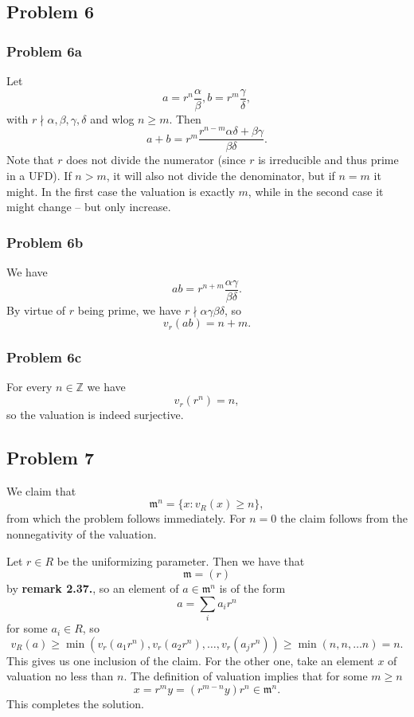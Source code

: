 \subsection*{Problem 6}

\subsubsection*{Problem 6a}

Let
\[ 
    a = r^n \frac{\alpha}{\beta}, b = r^m \frac{\gamma}{\delta},
\]
with \( r \nmid \alpha, \beta, \gamma, \delta \) and wlog \( n \geqslant m \). Then
\[ 
    a + b = r^m \frac{r^{n-m}\alpha\delta + \beta\gamma}{\beta\delta}.
\]
Note that \( r \) does not divide the numerator (since \( r \) is irreducible
and thus prime in a UFD). If \( n > m \), it will also not divide the denominator,
but if \( n = m \) it might. In the first case the valuation is exactly \( m \),
while in the second case it might change -- but only increase.

\subsubsection*{Problem 6b}

We have
\[ 
    ab = r^{n+m} \frac{\alpha\gamma}{\beta\delta}. 
\]
By virtue of \( r\) being prime, we have \( r \nmid \alpha\gamma\beta\delta \),
so
\[ 
    v_r(ab) = n + m. 
\]

\subsubsection*{Problem 6c}

For every \( n \in \mathbb{Z} \) we have
\[ 
    v_r(r^n) = n,   
\]
so the valuation is indeed surjective.

\subsection*{Problem 7}

We claim that
\[ 
    \mathfrak{m}^n = \{ x : v_R(x) \geqslant n \}, 
\]
from which the problem follows immediately. For \( n = 0 \) the claim follows
from the nonnegativity of the valuation.

Let \( r \in R \) be the uniformizing parameter. Then we have that 
\[ 
    \mathfrak{m} = (r)
\]
by {\bf remark 2.37.}, so an element of \(a \in \mathfrak{m}^n \) is of the form
\[ 
    a = \sum_i a_i r^n
\]
for some \( a_i \in R \), so 
\[ 
    v_R(a) \geqslant \min (v_r(a_1r^n), v_r(a_2r^n), \ldots, v_r(a_jr^n))
    \geqslant \min ( n, n, \ldots n ) = n.
\]
This gives us one inclusion of the claim. For the other one, take an element
\( x \) of valuation no less than \( n \). The definition of valuation implies
that for some \( m \geqslant n \)
\[ 
    x = r^m y = (r^{m-n}y) r^n \in \mathfrak{m}^n.
\]
This completes the solution.


